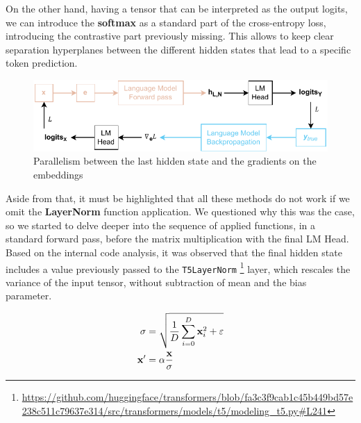 \documentclass[../thesis.tex]{subfiles}
\begin{document}
On the other hand, having a tensor that can be interpreted as the output logits, we can introduce the \textbf{softmax} as a standard part of the cross-entropy loss, introducing the contrastive part previously missing. This allows to keep clear separation hyperplanes between the different hidden states that lead to a specific token prediction.

\begin{figure}
    \centering
    \includegraphics[width=\linewidth]{assets/inverse-lm/grad_lm_head_parallelism.drawio.pdf}
    \caption{Parallelism between the last hidden state and the gradients on the embeddings}
    \label{fig:grad_lm_head_parallelism}
\end{figure}

Aside from that, it must be highlighted that all these methods do not work if we omit the \textbf{LayerNorm} function application.
We questioned why this was the case, so we started to delve deeper into the sequence of applied functions, in a standard forward pass, before the matrix multiplication with the final LM Head.
Based on the internal code analysis, it was observed that the final hidden state includes a value previously passed to the \texttt{T5LayerNorm}%
\footnote{\url{https://github.com/huggingface/transformers/blob/fa3c3f9cab1c45b449bd57e238c511c79637e314/src/transformers/models/t5/modeling\_t5.py\#L241}}
layer, which rescales the variance of the input tensor, without subtraction of mean and the bias parameter.

\begin{equation}
\begin{split}
    \sigma &= \sqrt{\frac{1}{D} \sum_{i=0}^D \mathbf{x}_i^2 + \varepsilon} \\
    \mathbf{x}' &= \alpha \frac{\mathbf{x}}{\sigma}
\end{split}
\end{equation}
\end{document}
